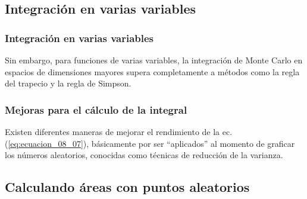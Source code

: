 \documentclass[12pt]{beamer}
\begin{document}
\subsection{Integración en varias variables}

\begin{frame}
\frametitle{Integración en varias variables}
Sin embargo, para funciones de varias variables, la integración de Monte Carlo en espacios de dimensiones mayores supera completamente a métodos como la regla del trapecio y la regla de Simpson.
\end{frame}
\begin{frame}
\frametitle{Mejoras para el cálculo de la integral}
Existen diferentes maneras de mejorar el rendimiento de la ec. (\ref{eq:ecuacion_08_07}), básicamente por ser \enquote{aplicados} al momento de graficar los números aleatorios, conocidas como técnicas de reducción de la varianza.
\end{frame}

\subsection{Calculando áreas con puntos aleatorios}
\end{document}
